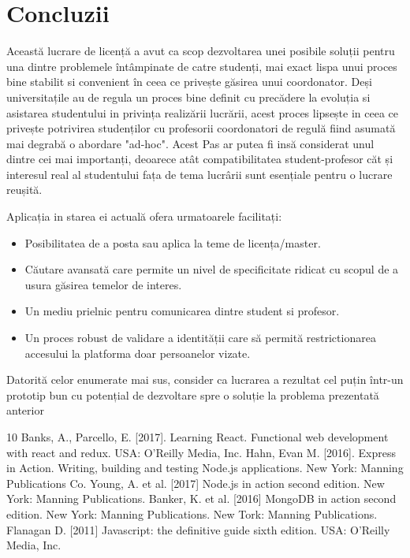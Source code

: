 \documentclass[12pt,a4paper,hidelinks]{report}
\theoremstyle{definition}
\theoremstyle{remark}
\begin{document}
\section{Concluzii}
Această lucrare de licență a avut ca scop dezvoltarea unei posibile soluții pentru una dintre problemele 
întâmpinate de catre studenți, mai exact lispa unui proces bine stabilit si convenient 
în ceea ce privește găsirea unui coordonator. Deși universitațile au de regula un proces bine definit 
cu precădere la evoluția si asistarea studentului in privința realizării lucrării, acest proces lipsește in ceea ce privește 
potrivirea studenților cu profesorii coordonatori de regulă fiind asumată mai degrabă o abordare "ad-hoc".
Acest Pas ar putea fi insă considerat unul dintre cei mai importanți, deoarece atât compatibilitatea student-profesor căt și interesul real al 
studentului fața de tema lucrârii sunt esențiale pentru o lucrare reușită.

Aplicația in starea ei actuală ofera urmatoarele facilitați:
\begin{itemize}
    \item Posibilitatea de a posta sau aplica la teme de licența/master.
    \item Căutare avansată care permite un nivel de specificitate ridicat cu scopul de a usura găsirea temelor de interes.
    \item Un mediu prielnic pentru comunicarea dintre student si profesor.
    \item Un proces robust de validare a identității care să permită restrictionarea accesului la platforma doar persoanelor vizate.
\end{itemize}
Datorită celor enumerate mai sus, consider ca lucrarea a rezultat cel puțin într-un prototip bun cu potențial de dezvoltare spre o soluție la problema prezentată anterior
\begin{thebibliography} {10}
    Banks, A., Parcello, E. [2017]. Learning React. Functional web development with react and redux. USA: O’Reilly Media, Inc. 
    Hahn, Evan M. [2016]. Express in Action. Writing, building and testing Node.js applications. New York: Manning Publications Co.
    Young, A. et al. [2017] Node.js in action second edition. New York: Manning Publications. 
    Banker, K. et al. [2016] MongoDB in action second edition. New York: Manning Publications. New Tork: Manning Publications. 
    Flanagan D. [2011] Javascript: the definitive guide sixth edition. USA: O’Reilly Media, Inc.
    
    \end{thebibliography}
\end{document}
